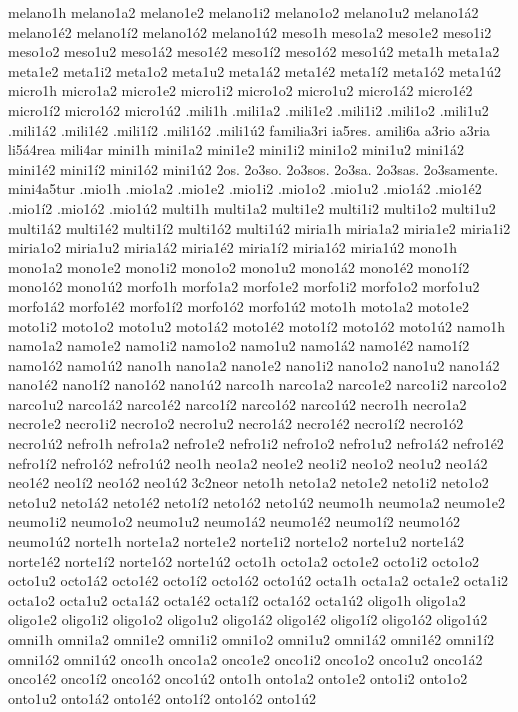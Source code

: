 {melano1h
melano1a2 melano1e2 melano1i2 melano1o2 melano1u2
melano1á2 melano1é2 melano1í2 melano1ó2 melano1ú2
meso1h
meso1a2 meso1e2 meso1i2 meso1o2 meso1u2
meso1á2 meso1é2 meso1í2 meso1ó2 meso1ú2
meta1h
meta1a2 meta1e2 meta1i2 meta1o2 meta1u2
meta1á2 meta1é2 meta1í2 meta1ó2 meta1ú2
micro1h
micro1a2 micro1e2 micro1i2 micro1o2 micro1u2
micro1á2 micro1é2 micro1í2 micro1ó2 micro1ú2
.mili1h
.mili1a2 .mili1e2 .mili1i2 .mili1o2 .mili1u2
.mili1á2 .mili1é2 .mili1í2 .mili1ó2 .mili1ú2
familia3ri
ia5res.
amili6a
a3rio
a3ria
li5á4rea
mili4ar
mini1h
mini1a2 mini1e2 mini1i2 mini1o2 mini1u2
mini1á2 mini1é2 mini1í2 mini1ó2 mini1ú2
2os.
2o3so.
2o3sos.
2o3sa.
2o3sas.
2o3samente.
mini4a5tur
.mio1h
.mio1a2 .mio1e2 .mio1i2 .mio1o2 .mio1u2
.mio1á2 .mio1é2 .mio1í2 .mio1ó2 .mio1ú2
multi1h
multi1a2 multi1e2 multi1i2 multi1o2 multi1u2
multi1á2 multi1é2 multi1í2 multi1ó2 multi1ú2
miria1h
miria1a2 miria1e2 miria1i2 miria1o2 miria1u2
miria1á2 miria1é2 miria1í2 miria1ó2 miria1ú2
mono1h
mono1a2 mono1e2 mono1i2 mono1o2 mono1u2
mono1á2 mono1é2 mono1í2 mono1ó2 mono1ú2
morfo1h
morfo1a2 morfo1e2 morfo1i2 morfo1o2 morfo1u2
morfo1á2 morfo1é2 morfo1í2 morfo1ó2 morfo1ú2
moto1h
moto1a2 moto1e2 moto1i2 moto1o2 moto1u2
moto1á2 moto1é2 moto1í2 moto1ó2 moto1ú2
namo1h
namo1a2 namo1e2 namo1i2 namo1o2 namo1u2
namo1á2 namo1é2 namo1í2 namo1ó2 namo1ú2
nano1h
nano1a2 nano1e2 nano1i2 nano1o2 nano1u2
nano1á2 nano1é2 nano1í2 nano1ó2 nano1ú2
narco1h
narco1a2 narco1e2 narco1i2 narco1o2 narco1u2
narco1á2 narco1é2 narco1í2 narco1ó2 narco1ú2
necro1h
necro1a2 necro1e2 necro1i2 necro1o2 necro1u2
necro1á2 necro1é2 necro1í2 necro1ó2 necro1ú2
nefro1h
nefro1a2 nefro1e2 nefro1i2 nefro1o2 nefro1u2
nefro1á2 nefro1é2 nefro1í2 nefro1ó2 nefro1ú2
neo1h
neo1a2 neo1e2 neo1i2 neo1o2 neo1u2
neo1á2 neo1é2 neo1í2 neo1ó2 neo1ú2
3c2neor
neto1h
neto1a2 neto1e2 neto1i2 neto1o2 neto1u2
neto1á2 neto1é2 neto1í2 neto1ó2 neto1ú2
neumo1h
neumo1a2 neumo1e2 neumo1i2 neumo1o2 neumo1u2
neumo1á2 neumo1é2 neumo1í2 neumo1ó2 neumo1ú2
norte1h
norte1a2 norte1e2 norte1i2 norte1o2 norte1u2
norte1á2 norte1é2 norte1í2 norte1ó2 norte1ú2
octo1h
octo1a2 octo1e2 octo1i2 octo1o2 octo1u2
octo1á2 octo1é2 octo1í2 octo1ó2 octo1ú2
octa1h
octa1a2 octa1e2 octa1i2 octa1o2 octa1u2
octa1á2 octa1é2 octa1í2 octa1ó2 octa1ú2
oligo1h
oligo1a2 oligo1e2 oligo1i2 oligo1o2 oligo1u2
oligo1á2 oligo1é2 oligo1í2 oligo1ó2 oligo1ú2
omni1h
omni1a2 omni1e2 omni1i2 omni1o2 omni1u2
omni1á2 omni1é2 omni1í2 omni1ó2 omni1ú2
onco1h
onco1a2 onco1e2 onco1i2 onco1o2 onco1u2
onco1á2 onco1é2 onco1í2 onco1ó2 onco1ú2
onto1h
onto1a2 onto1e2 onto1i2 onto1o2 onto1u2
onto1á2 onto1é2 onto1í2 onto1ó2 onto1ú2
}
